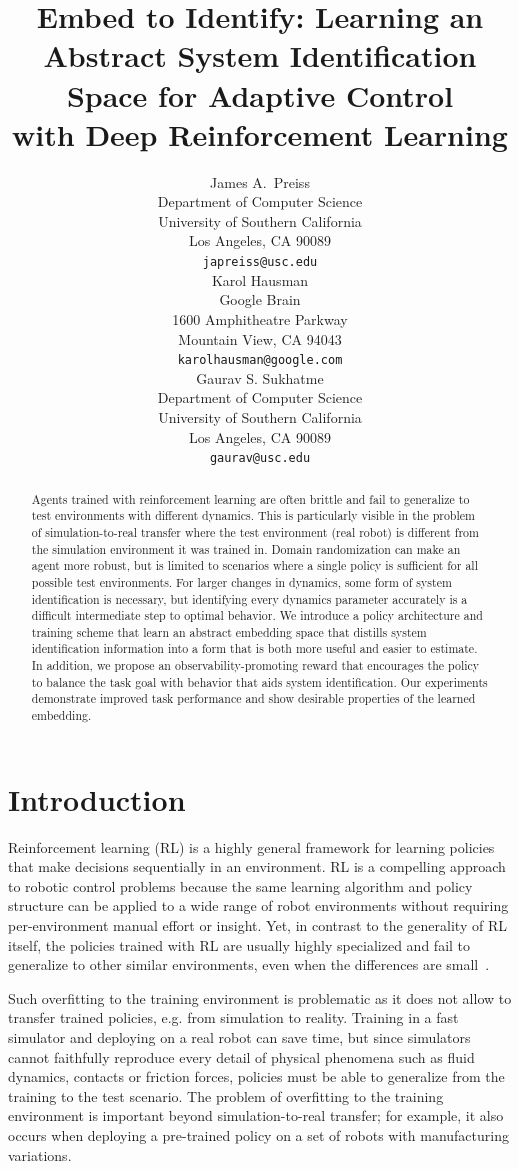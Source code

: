 \documentclass{article}
\title{Embed to Identify: Learning an Abstract System Identification Space for Adaptive Control\\ with Deep Reinforcement Learning}
\author{
  James A.~Preiss \\
  Department of Computer Science\\
  University of Southern California\\
  Los Angeles, CA 90089\\
  \texttt{japreiss@usc.edu} \\
  \AND
  Karol Hausman \\
  Google Brain \\
  1600 Amphitheatre Parkway\\
  Mountain View, CA 94043 \\
  \texttt{karolhausman@google.com} \\
  \And
  Gaurav S. Sukhatme \\
  Department of Computer Science\\
  University of Southern California\\
  Los Angeles, CA 90089\\
  \texttt{gaurav@usc.edu} \\
}
\begin{document}
\maketitle

\begin{abstract}
Agents trained with reinforcement learning are often brittle and fail to generalize to test environments with different dynamics.
This is particularly visible in the problem of simulation-to-real transfer where the test environment (real robot) is different from the simulation environment it was trained in.
Domain randomization can make an agent more robust,
but is limited to scenarios where a single policy is sufficient for all possible test environments.
For larger changes in dynamics, some form of system identification is necessary,
but identifying every dynamics parameter accurately is a difficult intermediate step to optimal behavior.
We introduce a policy architecture and training scheme that learn an abstract embedding space
that distills system identification information into a form that is both more useful and easier to estimate.
In addition, we propose an observability-promoting reward that encourages the policy to balance the task goal with behavior that aids system identification.
Our experiments demonstrate improved task performance and show desirable properties of the learned embedding.
\end{abstract}

\section{Introduction}

Reinforcement learning (RL) is a highly general framework for learning policies that make decisions sequentially in an environment.
RL is a compelling approach to robotic control problems
because the same learning algorithm and policy structure can be applied to a wide range of robot environments
without requiring per-environment manual effort or insight.
Yet, in contrast to the generality of RL itself,
the policies trained with RL are usually highly specialized and fail to generalize to other similar environments,
even when the differences are small~\citep{zhang-study-on-overfitting}.

Such overfitting to the training environment is problematic as it does not allow to transfer trained policies, e.g. from simulation to reality. Training in a fast simulator and deploying on a real robot can save time,
but since simulators cannot faithfully reproduce every detail of physical phenomena such as fluid dynamics, contacts or friction forces,
policies must be able to generalize from the training to the test scenario.
The problem of overfitting to the training environment is important beyond simulation-to-real transfer;
for example, it also occurs when deploying a pre-trained policy on a set of robots with manufacturing variations.
\end{document}
